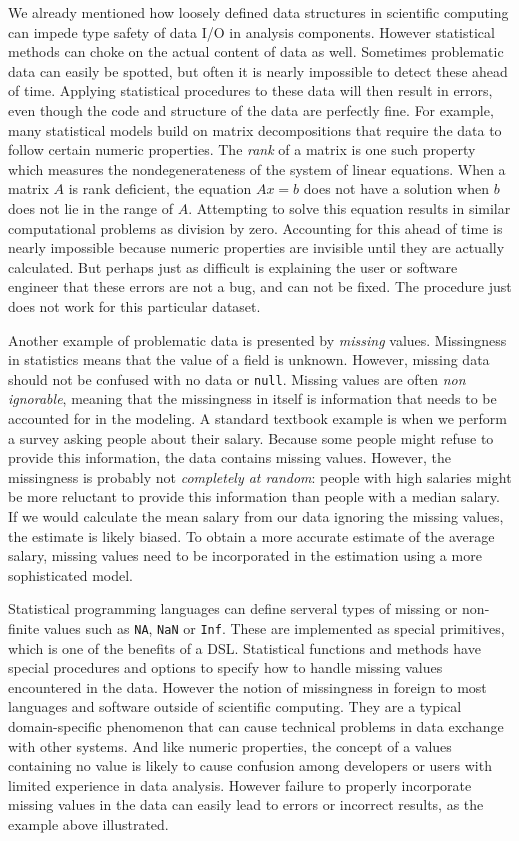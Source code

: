We already mentioned how loosely defined data structures in scientific computing can impede type safety of data I/O in analysis components. However statistical methods can choke on the actual content of data as well. Sometimes problematic data can easily be spotted, but often it is nearly impossible to detect these ahead of time. Applying statistical procedures to these data will then result in errors, even though the code and structure of the data are perfectly fine. For example, many statistical models build on matrix decompositions that require the data to follow certain numeric properties. The \emph{rank} of a matrix is one such property which measures the nondegenerateness of the system of linear equations. When a matrix $A$ is rank deficient, the equation $Ax=b$ does not have a solution when $b$ does not lie in the range of $A$. Attempting to solve this equation results in similar computational problems as division by zero. Accounting for this ahead of time is nearly impossible because numeric properties are invisible until they are actually calculated. But perhaps just as difficult is explaining the user or software engineer that these errors are not a bug, and can not be fixed. The procedure just does not work for this particular dataset.

Another example of problematic data is presented by \emph{missing} values. Missingness in statistics means that the value of a field is unknown. However, missing data should not be confused with no data or \texttt{null}. Missing values are often \emph{non ignorable}, meaning that the missingness in itself is information that needs to be accounted for in the modeling. A standard textbook example is when we perform a survey asking people about their salary. Because some people might refuse to provide this information, the data contains missing values. However, the missingness is probably not \emph{completely at random}: people with high salaries might be more reluctant to provide this information than people with a median salary. If we would calculate the mean salary from our data ignoring the missing values, the estimate is likely biased. To obtain a more accurate estimate of the average salary, missing values need to be incorporated in the estimation using a more sophisticated model. 

Statistical programming languages can define serveral types of missing or non-finite values such as \texttt{NA}, \texttt{NaN} or \texttt{Inf}. These are implemented as special primitives, which is one of the benefits of a DSL. Statistical functions and methods have special procedures and options to specify how to handle missing values encountered in the data. However the notion of missingness in foreign to most languages and software outside of scientific computing. They are a typical domain-specific phenomenon that can cause technical problems in data exchange with other systems. And like numeric properties, the concept of a values containing no value is likely to cause confusion among developers or users with limited experience in data analysis. However failure to properly incorporate missing values in the data can easily lead to errors or incorrect results, as the example above illustrated.

